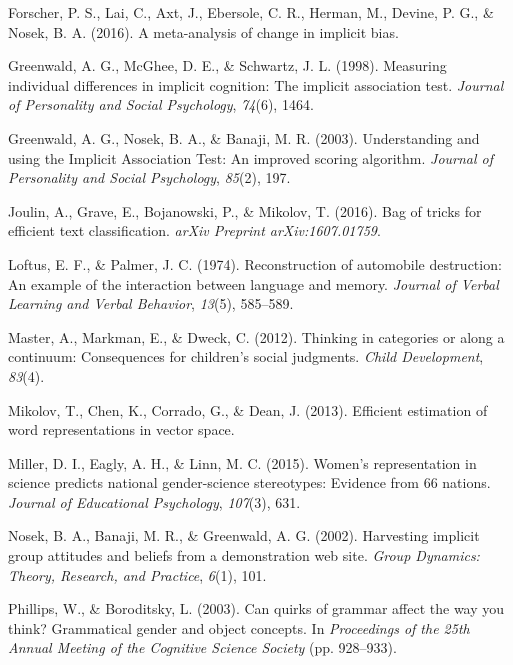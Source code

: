 \documentclass[man]{apa6}
\theoremstyle{definition}
\theoremstyle{definition}
\theoremstyle{definition}
\theoremstyle{remark}
\begin{document}
\hypertarget{ref-forscher2016meta}{}
Forscher, P. S., Lai, C., Axt, J., Ebersole, C. R., Herman, M., Devine,
P. G., \& Nosek, B. A. (2016). A meta-analysis of change in implicit
bias.

\hypertarget{ref-greenwald1998measuring}{}
Greenwald, A. G., McGhee, D. E., \& Schwartz, J. L. (1998). Measuring
individual differences in implicit cognition: The implicit association
test. \emph{Journal of Personality and Social Psychology}, \emph{74}(6),
1464.

\hypertarget{ref-greenwald2003understanding}{}
Greenwald, A. G., Nosek, B. A., \& Banaji, M. R. (2003). Understanding
and using the Implicit Association Test: An improved scoring algorithm.
\emph{Journal of Personality and Social Psychology}, \emph{85}(2), 197.

\hypertarget{ref-joulin2016bag}{}
Joulin, A., Grave, E., Bojanowski, P., \& Mikolov, T. (2016). Bag of
tricks for efficient text classification. \emph{arXiv Preprint
arXiv:1607.01759}.

\hypertarget{ref-loftus1974reconstruction}{}
Loftus, E. F., \& Palmer, J. C. (1974). Reconstruction of automobile
destruction: An example of the interaction between language and memory.
\emph{Journal of Verbal Learning and Verbal Behavior}, \emph{13}(5),
585--589.

\hypertarget{ref-master2012thinking}{}
Master, A., Markman, E., \& Dweck, C. (2012). Thinking in categories or
along a continuum: Consequences for children's social judgments.
\emph{Child Development}, \emph{83}(4).

\hypertarget{ref-mikolov2013efficient}{}
Mikolov, T., Chen, K., Corrado, G., \& Dean, J. (2013). Efficient
estimation of word representations in vector space.

\hypertarget{ref-miller2015women}{}
Miller, D. I., Eagly, A. H., \& Linn, M. C. (2015). Women's
representation in science predicts national gender-science stereotypes:
Evidence from 66 nations. \emph{Journal of Educational Psychology},
\emph{107}(3), 631.

\hypertarget{ref-nosek2002harvesting}{}
Nosek, B. A., Banaji, M. R., \& Greenwald, A. G. (2002). Harvesting
implicit group attitudes and beliefs from a demonstration web site.
\emph{Group Dynamics: Theory, Research, and Practice}, \emph{6}(1), 101.

\hypertarget{ref-phillips2003can}{}
Phillips, W., \& Boroditsky, L. (2003). Can quirks of grammar affect the
way you think? Grammatical gender and object concepts. In
\emph{Proceedings of the 25th Annual Meeting of the Cognitive Science
Society} (pp. 928--933).
\end{document}
